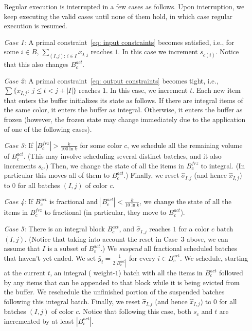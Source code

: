 \documentclass[12pt]{article}
\begin{document}
Regular execution is interrupted in a few cases as follows. Upon
interruption, we keep executing the valid cases until none of them
hold, in which case regular execution is resumed.

{\em Case 1:}\/ A primal constraint~\eqref{eq: input constraints}
becomes satisfied, i.e., for some $i\in B$, $\sum_{(I,j):\ i\in I} x_{I,j}$
reaches $1$. In this case we increment $s_{c(i)}$. Notice that this also
changes $B_c^{act}$.

{\em Case 2:}\/ A primal constraint~\eqref{eq: output constraints}
becomes tight, i.e., $\sum\{x_{I,j}:\ j\le t < j + |I|\}$ reaches $1$.
In this case, we increment $t$. Each new item that enters the
buffer initializes its state as follows. If there are integral
items of the same color, it enters the buffer as integral.
Otherwise, it enters the buffer as frozen (however, the
frozen state may change immediately due to the application
of one of the following cases).

{\em Case 3:}\/ If $|B_c^{frz}| > \frac{k}{100\ln k}$ for
some color $c$, we schedule all the remaining
volume of $B_c^{act}$. (This may involve scheduling
several distinct batches, and it also increments $s_c$.) Then,
we change the state of all the items in $B_c^{frz}$ to integral.
(In particular this moves all of them to $B_c^{act}$.)
Finally, we reset $\hat{\sigma}_{I,j}$ (and hence $\hat{x}_{I,j}$) 
to $0$ for all batches $(I,j)$ of color $c$.

{\em Case 4:}\/ If $B_c^{act}$ is fractional and
$|B_c^{act}| < \frac{k}{10\ln k}$, we change the
state of all the items in $B_c^{frz}$ to fractional
(in particular, they move to $B_c^{act}$).

{\em Case 5:}\/ There is an integral block $B_c^{act}$,
and $\hat{\sigma}_{I,j}$ reaches $1$ for a color $c$
batch $(I,j)$. (Notice that taking into account the reset
in Case~3 above, we can assume that $I$ is a subset of 
$B_c^{act}$.)
We {\em suspend} all fractional scheduled batches
that haven't yet ended. We set
$\bar{y}_i = \frac{1}{2|B_c^{act}|}$ for every $i\in B_c^{act}$.
We schedule, starting at the current $t$, an integral
( weight-$1$) batch with all the items in $B_c^{act}$ followed
by any items that can be appended to that block while it
is being evicted from the buffer. We reschedule
the unfinished portion of the suspended batches following
this integral batch. Finally, we reset $\hat{\sigma}_{I,j}$ 
(and hence $\hat{x}_{I,j}$) to $0$ for all batches $(I,j)$ of 
color $c$. Notice that following this case, both
$s_c$ and $t$ are incremented by at least $|B_c^{act}|$.
\end{document}
